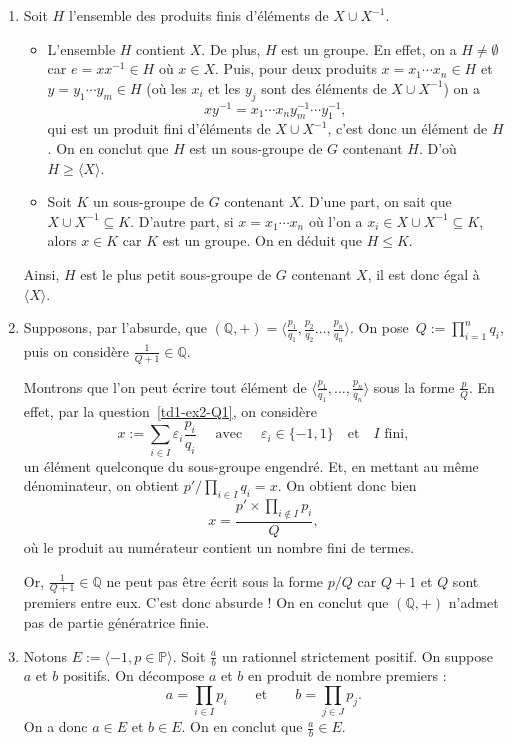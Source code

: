 \documentclass[./main]{subfiles}
\begin{document}
  \begin{enumerate}
    \item Soit $H$ l'ensemble des produits finis d'éléments de $X \cup X^{-1}$.
      \begin{itemize}
        \item L'ensemble $H$ contient $X$. De plus, $H$ est un groupe.
          En effet, on a $H \neq \emptyset$ car $e = x x^{-1} \in H$ où $x \in X$.
          Puis, pour deux produits $x = x_1 \cdots x_n \in H$ et $y = y_1 \cdots y_m \in H$ (où les $x_i$ et les $y_j$ sont des éléments de $X \cup X^{-1}$) on a \[
            x y^{-1} = x_1 \cdots x_n y_m^{-1} \cdots y_1^{-1}
          ,\] qui est un produit fini d'éléments de $X \cup X^{-1}$, c'est donc un élément de $H$.
          On en conclut que $H$ est un sous-groupe de $G$ contenant $H$.
          D'où $H \ge \langle X\rangle$.
        \item Soit $K$ un sous-groupe de $G$ contenant $X$.
          D'une part, on sait que $X \cup X^{-1} \subseteq K$.
          D'autre part, si $x = x_1\cdots x_n$ où l'on a $x_i \in X \cup X^{-1} \subseteq K$, alors $x \in K$ car $K$ est un groupe.
          On en déduit que $H \le K$.
      \end{itemize}
      Ainsi, $H$ est le plus petit sous-groupe de $G$ contenant $X$, il est donc égal à $\langle X \rangle$.
    \item Supposons, par l'absurde, que $(\mathds{Q}, +) = \big\langle \frac{p_1}{q_1}, \frac{p_2}{q_2} \ldots, \frac{p_n}{q_n}\big\rangle$.
      On pose~$Q := \prod_{i=1}^n q_i$, puis on considère $\frac{1}{Q + 1} \in \mathds{Q}$.

      Montrons que l'on peut écrire tout élément de  $\big\langle \frac{p_1}{q_1}, \ldots, \frac{p_n}{q_n} \big\rangle$ sous la forme $\frac{p}{Q}$.
      En effet, par la question~\ref{td1-ex2-Q1}, on considère \[
        x := \sum_{i \in I} \varepsilon_i \frac{p_i}{q_i} \quad \text{ avec }\quad \varepsilon_i \in \{-1,1\} \quad \text{et} \quad I \text{ fini}
      ,\] un élément quelconque du sous-groupe engendré.
      Et, en mettant au même dénominateur, on obtient $p' / \prod_{i \in I} q_i = x$.
      On obtient donc bien \[
        x = \frac{p' \times \prod_{i \not\in I} p_i}{Q}
      ,\] 
      où le produit au numérateur contient un nombre fini de termes.

      Or, $\frac{1}{Q+1}\in \mathds{Q}$ ne peut pas être écrit sous la forme $p / Q$ car $Q +1$ et $Q$ sont premiers entre eux.
      C'est donc absurde !
      On en conclut que $(\mathds{Q},+)$ n'admet pas de partie génératrice finie.
    \item Notons $E := \langle -1, p \in \mathds{P}\rangle$.
      Soit $\frac{a}{b}$ un rationnel strictement positif.
      On suppose $a$ et $b$ positifs.
      On décompose $a$ et $b$ en produit de nombre premiers : \[
        a = \prod_{i \in I} p_i \quad\quad \text{et}\quad\quad b = \prod_{j \in J} p_j
      .\]
      On a donc $a \in E$ et $b \in E$.
      On en conclut que $\frac{a}{b} \in E$.


\end{enumerate}
\end{document}
